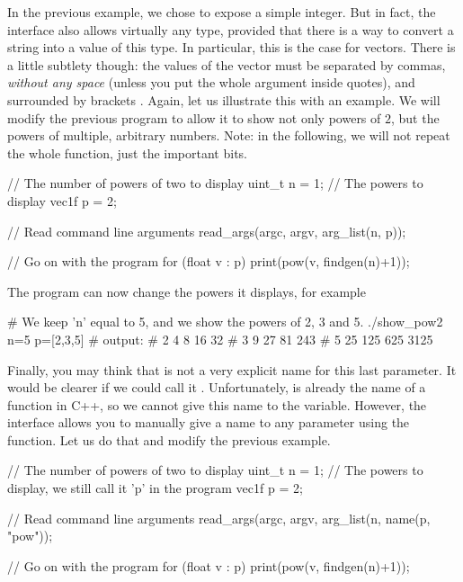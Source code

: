 \documentclass[12pt]{report}
\newenvironment{example}
{
    \begin{mdframed}[style=example,frametitle={Example}]
}
{
    \end{mdframed}
}
\begin{document}
In the previous example, we chose to expose a simple integer. But in fact, the interface also allows virtually any type, provided that there is a way to convert a string into a value of this type. In particular, this is the case for vectors. There is a little subtlety though: the values of the vector must be separated by commas, \emph{without any space} (unless you put the whole argument inside quotes), and surrounded by brackets \cppinline{[...]}. Again, let us illustrate this with an example. We will modify the previous program to allow it to show not only powers of $2$, but the powers of multiple, arbitrary numbers. Note: in the following, we will not repeat the whole  function, just the important bits.

\begin{example}
\begin{cppcode}
    // The number of powers of two to display
    uint_t n = 1;
    // The powers to display
    vec1f p = {2};

    // Read command line arguments
    read_args(argc, argv, arg_list(n, p));

    // Go on with the program
    for (float v : p) {
        print(pow(v, findgen(n)+1));
    }
\end{cppcode}
\end{example}

The program can now change the powers it displays, for example
\begin{bashcode}
# We keep 'n' equal to 5, and we show the powers of 2, 3 and 5.
./show_pow2 n=5 p=[2,3,5]
# output:
# 2 4 8 16 32
# 3 9 27 81 243
# 5 25 125 625 3125
\end{bashcode}

Finally, you may think that  is not a very explicit name for this last parameter. It would be clearer if we could call it . Unfortunately,  is already the name of a function in C++, so we cannot give this name to the variable. However, the  interface allows you to manually give a name to any parameter using the  function. Let us do that and modify the previous example.

\begin{example}
\begin{cppcode}
    // The number of powers of two to display
    uint_t n = 1;
    // The powers to display, we still call it 'p' in the program
    vec1f p = {2};

    // Read command line arguments
    read_args(argc, argv, arg_list(n, name(p, "pow"));

    // Go on with the program
    for (float v : p) {
        print(pow(v, findgen(n)+1));
    }
\end{cppcode}
\end{example}
\end{document}
